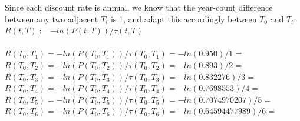 \documentclass{article}
\begin{document}
{Since each discount rate is annual, we know that the year-count difference between any two adjacent $T_i$ is 1, and adapt this accordingly between $T_0$ and $T_i$: \\ $R(t, T) := -ln(P(t, T)) / \tau(t, T)$ \\ \\
$R(T_0, T_1) = -ln(P(T_0, T_1)) / \tau(T_0, T_1) = -ln(0.950) / 1 = $  \\
$R(T_0, T_2) = -ln(P(T_0, T_2)) / \tau(T_0, T_2) = -ln(0.893) / 2 = $  \\
$R(T_0, T_3) = -ln(P(T_0, T_3)) / \tau(T_0, T_3) = -ln(0.832276) / 3 = $  \\
$R(T_0, T_4) = -ln(P(T_0, T_4)) / \tau(T_0, T_4) = -ln(0.7698553) / 4 = $  \\
$R(T_0, T_5) = -ln(P(T_0, T_5)) / \tau(T_0, T_5) = -ln(0.7074970207) / 5 = $  \\
$R(T_0, T_6) = -ln(P(T_0, T_6)) / \tau(T_0, T_6) = -ln(0.64594477989) / 6 = $  \\


}
\end{document}
